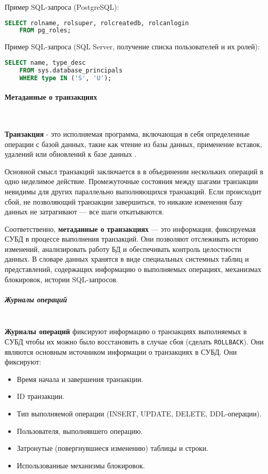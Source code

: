 \begin{enumerate}
    Пример SQL-запроса (PostgreSQL):
    \begin{lstlisting}[language=SQL]
    SELECT rolname, rolsuper, rolcreatedb, rolcanlogin 
    FROM pg_roles;             
    \end{lstlisting}

    Пример SQL-запроса (SQL Server, получение списка пользователей и их ролей):
    \begin{lstlisting}[language=SQL]
    SELECT name, type_desc 
    FROM sys.database_principals 
    WHERE type IN ('S', 'U');              
    \end{lstlisting}

\end{enumerate}

\paragraph{Метаданные о транзакциях} ~\\

\begin{grayquote}
    \textbf{Транзакция} - это исполняемая программа, включающая в себя определенные операции с базой данных, такие как чтение из базы данных, применение вставок, удалений или обновлений к базе данных \autocite{ElmasriNavathe}.
\end{grayquote}

Основной смысл транзакций заключается в в объединении нескольких операций в одно неделимое действие. Промежуточные состояния между шагами транзакции невидимы для других параллельно выполняющихся транзакций. Если происходит сбой, не позволяющий транзакции завершиться, то никакие изменения базу данных не затрагивают — все шаги откатываются. \autocite{PostgreSQLdocc3p4}

Соответственно, \textbf{метаданные о транзакциях} — это информация, фиксируемая СУБД в процессе выполнения транзакций. Они позволяют отслеживать историю изменений, анализировать работу БД и обеспечивать контроль целостности данных. В словаре данных хранятся в виде специальных системных таблиц и представлений, содержащих информацию о выполняемых операциях, механизмах блокировок, истории SQL-запросов.

\subparagraph{Журналы операций} ~\\

\textbf{Журналы операций} фиксируют информацию о транзакциях выполняемых в СУБД чтобы их можно было восстановить в случае сбоя (сделать \texttt{ROLLBACK}). Они являются основным источником информации о транзакциях в СУБД. Они фиксируют:
\begin{itemize}
    \item Время начала и завершения транзакции.
    \item ID транзакции.
    \item Тип выполняемой операции (INSERT, UPDATE, DELETE, DDL-операции).
    \item Пользователя, выполнявшего операцию.
    \item Затронутые (повергнувшиеся изменению) таблицы и строки.
    \item Использованные механизмы блокировок.
\end{itemize}


